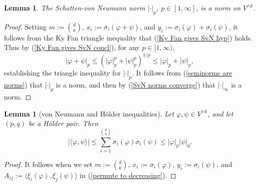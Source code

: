 \documentclass[reqno,11pt]{amsart}
\newtheorem{lemma}[theorem]{Lemma}
\theoremstyle{definition}
\numberwithin{equation}{section}
\begin{document}
\begin{lemma}
The Schatten-von Neumann norm $|\cdot|_p$, $p \in [1, \infty]$, is a norm on $V^{\wedge k}$.
\end{lemma}
\begin{proof}
Setting $m := \binom dk$, $x_i := \sigma_i(\varphi + \psi)$, and $y_i := \sigma_i(\varphi) + \sigma_i(\psi)$, it follows from the Ky Fan triangle inequality that (\ref{Ky Fan gives SvN hyp}) holds.
Thus by (\ref{Ky Fan gives SvN concl}), for any $p \in [1, \infty)$,
\begin{equation}\label{proving SvN is a norm}
|\varphi + \psi|_p \leq (|\varphi|_p^p + |\psi|_p^p)^{1/p} \leq |\varphi|_p + |\psi|_p,
\end{equation}
establishing the triangle inequality for $|\cdot|_p$.
It follows from (\ref{seminorms are norms}) that $|\cdot|_p$ is a norm, and then by (\ref{SvN norms converge}) that $|\cdot|_\infty$ is a norm.
\end{proof}


\begin{lemma}[von Neumann and H\"older inequalities]
Let $\varphi, \psi \in V^{\wedge k}$, and let $(p, q)$ be a H\"older pair. Then 
$$|\langle \varphi, \psi\rangle| \leq \sum_{i=1}^{\binom dk} \sigma_i(\varphi) \sigma_i(\psi) \leq |\varphi|_p |\psi|_q.$$
\end{lemma}
\begin{proof}
It follows when we set $m := \binom dk$, $x_i := \sigma_i(\varphi)$, $y_i := \sigma_i(\psi)$, and $A_{ij} := \langle \xi_i(\varphi), \xi_j(\psi)\rangle$ in (\ref{permute to decreasing}).
\end{proof}


\end{document}
